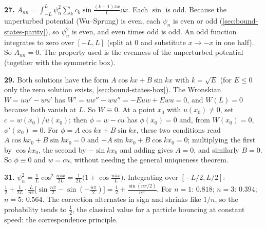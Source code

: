 \textbf{27.} $A_{nn}=\int_{-L}^{L}\psi_n^2\sum_kc_k\sin\frac{(k+1)\pi x}{L}\dd x$. Each $\sin$ is odd. Because the unperturbed potential (Wu--Sprung) is even, each $\psi_n$ is even or odd (\cref{sec:bound-states-parity}), so $\psi_n^2$ is even, and even times odd is odd. An odd function integrates to zero over $[-L,L]$ (split at 0 and substitute $x\to-x$ in one half). So $A_{nn}=0$. The property used is the evenness of the unperturbed potential (together with the symmetric box).

\textbf{29.} Both solutions have the form $A\cos kx+B\sin kx$ with $k=\sqrt E$ (for $E\le0$ only the zero solution exists, \cref{sec:bound-states-box}). The Wronskian $W=uw'-wu'$ has $W'=uw''-wu''=-Euw+Ewu=0$, and $W(L)=0$ because both vanish at $L$. So $W\equiv0$. At a point $x_0$ with $u(x_0)\ne0$, set $c=w(x_0)/u(x_0)$; then $\phi=w-cu$ has $\phi(x_0)=0$ and, from $W(x_0)=0$, $\phi'(x_0)=0$. For $\phi=A\cos kx+B\sin kx$, these two conditions read $A\cos kx_0+B\sin kx_0=0$ and $-A\sin kx_0+B\cos kx_0=0$; multiplying the first by $\cos kx_0$, the second by $-\sin kx_0$ and adding gives $A=0$, and similarly $B=0$. So $\phi\equiv0$ and $w=cu$, without needing the general uniqueness theorem.

\textbf{31.} $\psi_n^2=\frac1L\cos^2\frac{n\pi x}{2L}=\frac{1}{2L}\bigl(1+\cos\frac{n\pi x}{L}\bigr)$. Integrating over $[-L/2,L/2]$: $\frac12+\frac{1}{2L}\cdot\frac{L}{n\pi}\bigl[\sin\frac{n\pi}{2}-\sin(-\frac{n\pi}{2})\bigr]=\frac12+\frac{\sin(n\pi/2)}{n\pi}$. For $n=1$: $0.818$; $n=3$: $0.394$; $n=5$: $0.564$. The correction alternates in sign and shrinks like $1/n$, so the probability tends to $\frac12$, the classical value for a particle bouncing at constant speed: the correspondence principle.
